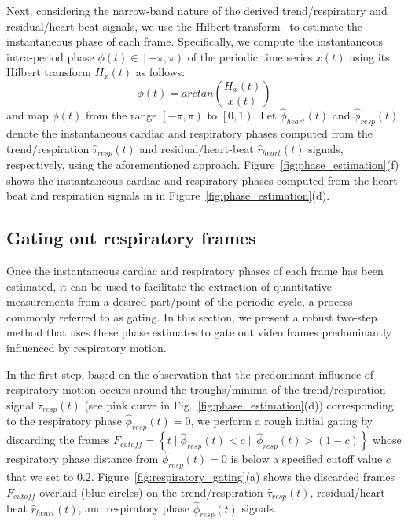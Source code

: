 \documentclass[runningheads,a4paper]{llncs}
\begin{document}
	Next, considering the narrow-band nature of the derived trend/respiratory and residual/heart-beat signals, we use the Hilbert transform~\cite{Lu2013} to estimate the instantaneous phase of each frame. Specifically, we compute the instantaneous intra-period phase $\phi(t) \in \left [  -\pi, \pi\right )$ of the periodic time series $x(t)$ using its Hilbert transform $H_x(t)$ as follows:
\begin{equation}
\phi(t) = arctan \left( \frac{H_x(t)}{x(t)}\right)
\end{equation} 
and map $\phi(t)$ from the range $\left [  -\pi, \pi\right )$ to $\left [  0, 1\right )$. Let $\hat{\phi}_{heart}(t)$ and $\hat{\phi}_{resp}(t)$ denote the instantaneous cardiac and respiratory phases computed from the trend/respiration $\hat{\tau}_{resp}(t)$ and residual/heart-beat $\hat{r}_{heart}(t)$ signals, respectively, using the aforementioned approach. Figure~\ref{fig:phase_estimation}(f) shows the instantaneous cardiac and respiratory phases computed from the heart-beat and respiration signals in in Figure~\ref{fig:phase_estimation}(d). 

\subsection{Gating out respiratory frames}
\label{sec:method:gating}
%
Once the instantaneous cardiac and respiratory phases of each frame has been estimated, it can be used to facilitate the extraction of quantitative measurements from a desired part/point of the periodic cycle, a process commonly referred to as gating. In this section, we present a robust two-step method that uses these phase estimates to gate out video frames predominantly influenced by respiratory motion.

	In the first step, based on the observation that the predominant influence of respiratory motion occurs around the troughs/minima of the trend/respiration signal $\hat{\tau}_{resp}(t)$ (see pink curve in Fig.~\ref{fig:phase_estimation}(d)) corresponding to the respiratory phase $\hat{\phi}_{resp}(t) = 0$, we perform a rough initial gating by discarding the frames $F_{cutoff} = \left \{ t \mid \hat{\phi}_{resp}(t) < c \parallel \hat{\phi}_{resp}(t) > (1 - c) \right \}$ whose respiratory phase distance from $\hat{\phi}_{resp}(t) = 0$ is below a specified cutoff value $c$ that we set to 0.2. Figure~\ref{fig:respiratory_gating}(a) shows the discarded frames $F_{cutoff}$ overlaid (blue circles) on the trend/respiration $\hat{\tau}_{resp}(t)$, residual/heart-beat  $\hat{r}_{heart}(t)$, and respiratory phase $\hat{\phi}_{resp}(t)$ signals.
	
\end{document}
